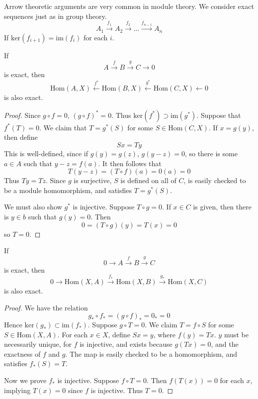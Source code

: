 Arrow theoretic arguments are very common in module theory. We consider exact sequences just as in group theory.
%
\[ A_1 \xrightarrow{f_1} A_2 \xrightarrow{f_2} \dots \xrightarrow{f_{n-1}} A_n \]
%
If $\text{ker}(f_{i+1}) = \text{im}(f_i)$ for each $i$.

\begin{theorem}
    If
    \[ A \xrightarrow{f} B \xrightarrow{g} C \xrightarrow{} 0 \]
    is exact, then
    \[ \text{Hom}(A,X) \xleftarrow{f^*} \text{Hom}(B,X) \xleftarrow{g^*} \text{Hom}(C,X) \xleftarrow{} 0 \]
    is also exact.
\end{theorem}
\begin{proof}
    Since $g \circ f = 0$,  $(g \circ f)^* = 0$. Thus $\text{ker}(f^*) \supset \text{im}(g^*)$. Suppose that $f^*(T) = 0$. We claim that $T = g^*(S)$ for some $S \in \text{Hom}(C,X)$. If $x = g(y)$, then define
    \[ Sx = Ty \]
    This is well-defined, since if $g(y) = g(z)$, $g(y - z) = 0$, so there is some $a \in A$ such that $y - z = f(a)$. It then follows that
    \[ T(y - z) = (T \circ f)(a) = 0(a) = 0 \]
    Thus $Ty = Tz$. Since $g$ is surjective, $S$ is defined on all of $C$, is easily checked to be a module homomorphism, and satisfies $T = g^*(S)$.

    We must also show $g^*$ is injective. Suppose $T \circ g = 0$. If $x \in C$ is given, then there is $y \in b$ such that $g(y) = 0$. Then
    \[ 0 = (T \circ g)(y) = T(x) = 0 \]
    so $T = 0$.
\end{proof}

\begin{theorem}
    If
    \[ 0 \xrightarrow{} A \xrightarrow{f} B \xrightarrow{g} C \]
    is exact, then
    \[ 0 \xrightarrow{} \text{Hom}(X,A) \xrightarrow{f_*} \text{Hom}(X,B) \xrightarrow{g_*} \text{Hom}(X,C) \]
    is also exact.
\end{theorem}
\begin{proof}
    We have the relation
    \[ g_* \circ f_* = (g \circ f)_* = 0_* = 0 \]
    Hence $\text{ker}(g_*) \subset \text{im}(f_*)$. Suppose $g \circ T = 0$. We claim $T = f \circ S$ for some $S \in \text{Hom}(X,A)$. For each $x \in X$, define $Sx = y$, where $f(y) = Tx$. $y$ must be necessarily unique, for $f$ is injective, and exists because $g(Tx) = 0$, and the exactness of $f$ and $g$. The map is easily checked to be a homomorphism, and satisfies $f_*(S) = T$.

    Now we prove $f_*$ is injective. Suppose $f \circ T = 0$. Then $f(T(x)) = 0$ for each $x$, implying $T(x) = 0$ since $f$ is injective. Thus $T = 0$.
\end{proof}

